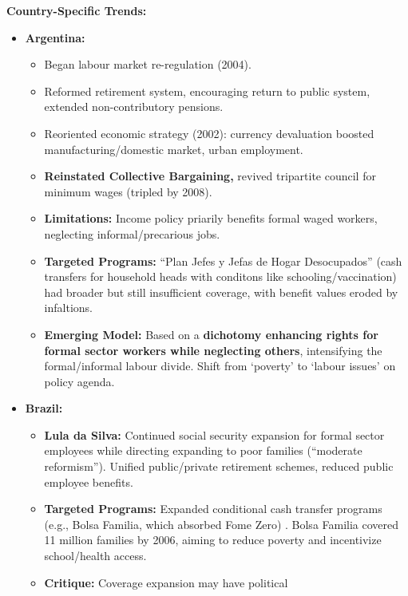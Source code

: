 \documentclass{article}
\begin{document}
    \noindent \textbf{Country-Specific Trends:}
    \begin{itemize}
        \item \textbf{Argentina:}
        \begin{itemize}
            \item Began labour market re-regulation (2004).
            \item Reformed retirement system, encouraging return to public
            system, extended non-contributory pensions.
            \item Reoriented economic strategy (2002): currency devaluation
            boosted manufacturing/domestic market, urban employment.
            \item \textbf{Reinstated Collective Bargaining,} revived
            tripartite council for minimum wages (tripled by 2008).
            \item \textbf{Limitations:} Income policy priarily benefits
            formal waged workers, neglecting informal/precarious jobs.
            \item \textbf{Targeted Programs:} ``Plan Jefes y Jefas de Hogar
            Desocupados'' (cash transfers for household heads with conditons
            like schooling/vaccination) had broader but still insufficient
            coverage, with benefit values eroded by infaltions.
            \item \textbf{Emerging Model:} Based on a
            \textbf{dichotomy enhancing rights for formal sector workers while neglecting others}, intensifying the formal/informal labour divide. Shift from `poverty' to `labour issues' on policy agenda.
        \end{itemize}
        \item \textbf{Brazil:}
        \begin{itemize}
            \item \textbf{Lula da Silva:} Continued social security
            expansion for formal sector employees while directing expanding
            to poor families (``moderate reformism''). Unified
            public/private retirement schemes, reduced public employee benefits.
            \item \textbf{Targeted Programs:} Expanded conditional cash
            transfer programs (e.g., Bolsa Familia, which absorbed Fome Zero)
            . Bolsa Familia covered 11 million families by 2006, aiming to
            reduce poverty and incentivize school/health access.
            \item \textbf{Critique:} Coverage expansion may have political

\end{itemize}
\end{itemize}
\end{document}
